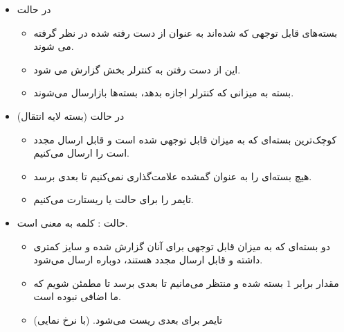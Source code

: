 \documentclass[12pt]{article}
\begin{document}
\begin{enumerate}
\begin{itemize}
\begin{itemize}
\item در حالت 

\begin{itemize}
	\item بسته‌های قابل توجهی که  شده‌اند به عنوان از دست رفته شده در نظر گرفته می شوند.
	
	\item این از دست رفتن به کنترلر بخش  گزارش می شود.
	
	\item بسته به میزانی که کنترلر  اجازه بدهد، بسته‌ها بازارسال می‌شوند.
	\end{itemize}

\item در حالت  (بسته لایه انتقال)

\begin{itemize}
	\item کوچک‌‌ترین بسته‌ای که به میزان قابل توجهی  شده است و قابل ارسال مجدد است را ارسال می‌کنیم.
	
	\item هیچ بسته‌ای را به عنوان گمشده علامت‌گذاری نمی‌کنیم تا  بعدی برسد.
	
	\item
	تایمر را برای حالت  یا  ریستارت می‌کنیم.
\end{itemize}

\item حالت :
کلمه  به معنی  است.

\begin{itemize}
	\item دو بسته‌ای که به میزان قابل توجهی  برای آنان گزارش شده و سایز کمتری داشته و قابل ارسال مجدد هستند، دوباره ارسال می‌شود.
	
	\item
	
	مقدار  برابر $1$ بسته شده و منتظر می‌مانیم تا  بعدی برسد تا مطمئن شویم که  ما اضافی نبوده است.
	
	\item
	تایمر برای  بعدی ریست می‌شود. (با نرخ  نمایی)
\end{itemize}
\end{itemize}
\end{itemize}

\end{enumerate}
\end{document}
